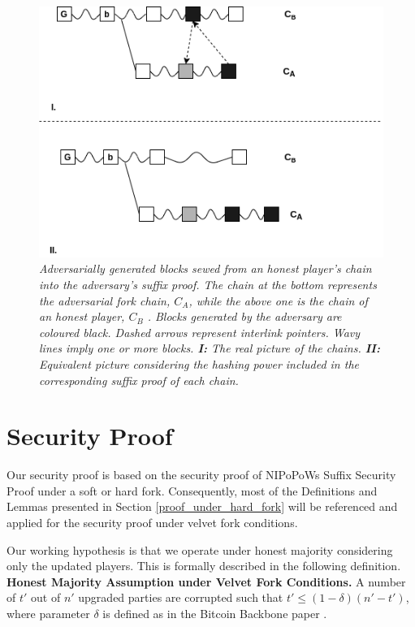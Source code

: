\documentclass[9pt,a4paper]{article}
\begin{document}
\begin{figure}[h!]
	\begin{center}
		\includegraphics[scale=0.6]{figures/injection.png}
	\end{center}
	\caption{\textit{Adversarially generated blocks sewed from an honest player's chain into the adversary's suffix proof. The chain at the bottom represents the adversarial fork chain, $C_A$, while the above one is the chain of an honest player, $C_B$ . Blocks generated by the adversary are coloured black. Dashed arrows represent interlink pointers. Wavy lines imply one or more blocks. \textbf{I:} The real picture of the chains. \textbf{II:} Equivalent picture considering the hashing power included in the corresponding suffix proof of each chain.}}
	\label{fig:injection}
\end{figure}

\section{Security Proof}
Our security proof is based on the security proof of NIPoPoWs Suffix Security Proof under a soft or hard fork. Consequently, most of the Definitions and Lemmas presented in Section \ref{proof_under_hard_fork} will be referenced and applied for the security proof under velvet fork conditions.

Our working hypothesis is that we operate under honest majority considering only the updated players. This is formally described in the following definition.\\

\textbf{Honest Majority Assumption under Velvet Fork Conditions.} A number of $t'$ out of $n'$ upgraded parties are corrupted such that $t' \leq (1 - \delta)(n' - t')$, where parameter $\delta$ is defined as in the Bitcoin Backbone paper \cite{Backbone}.\\
\end{document}
